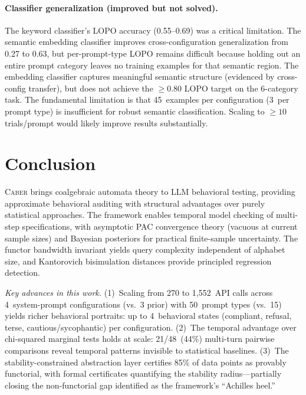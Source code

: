 \documentclass[11pt]{article}
\newcommand{\tool}{\textsc{Caber}}
\begin{document}
\paragraph{Classifier generalization (improved but not solved).}
The keyword classifier's LOPO accuracy (0.55--0.69) was a critical
limitation.  The semantic embedding classifier improves
cross-configuration generalization from 0.27 to 0.63, but
per-prompt-type LOPO remains difficult because holding out
an entire prompt category leaves no training examples for that
semantic region.  The embedding classifier captures
meaningful semantic structure (evidenced by cross-config transfer),
but does not achieve the ${\ge}0.80$ LOPO target on the
6-category task.  The fundamental limitation is that 45~examples
per configuration (3~per prompt type) is insufficient for
robust semantic classification.  Scaling to ${\ge}10$ trials/prompt
would likely improve results substantially.

\section{Conclusion}\label{sec:conclusion}

\tool{} brings coalgebraic automata theory to LLM behavioral testing,
providing approximate behavioral auditing with structural advantages
over purely statistical approaches.
The framework enables temporal model checking of multi-step specifications,
with asymptotic PAC convergence theory (vacuous at current sample sizes)
and Bayesian posteriors for practical finite-sample uncertainty.
The functor bandwidth invariant yields query
complexity independent of alphabet size, and Kantorovich bisimulation
distances provide principled regression detection.

\emph{Key advances in this work.}
(1)~Scaling from 270 to 1{,}552~API calls across 4~system-prompt
configurations (vs.\ 3 prior) with 50~prompt types (vs.\ 15)
yields richer behavioral portraits: up to 4~behavioral states
(compliant, refusal, terse, cautious/sycophantic) per configuration.
(2)~The temporal advantage over chi-squared marginal tests holds
at scale: 21/48~(44\%) multi-turn pairwise comparisons reveal
temporal patterns invisible to statistical baselines.
(3)~The stability-constrained abstraction layer certifies 85\%
of data points as provably functorial, with formal certificates
quantifying the stability radius---partially closing the
non-functorial gap identified as the framework's ``Achilles heel.''
\end{document}
